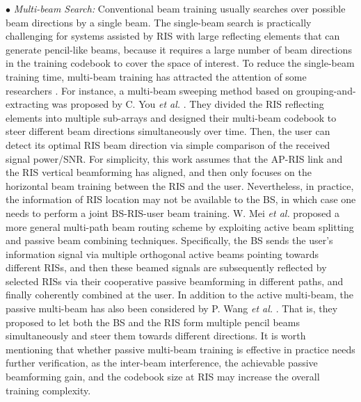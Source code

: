 \documentclass[journal,comsoc]{IEEEtran}
\begin{document}
$\bullet$ \emph{Multi-beam Search:} Conventional beam training usually searches over possible beam directions by a single beam. The single-beam search is practically challenging for systems assisted by RIS with large reflecting elements that can generate pencil-like beams, because it requires a large number of beam directions in the training codebook to cover the space of interest. To reduce the single-beam training time, multi-beam training has attracted the attention of some researchers \cite{Fast-Beam-Training-IRS-2020,Multi-Path-Beam-Routing-RIS-2022,Beam-Training-Alignment-RIS-2022,Fast-Beam-Training-Alignment-IRS-2022}. For instance, a multi-beam sweeping method based on grouping-and-extracting was proposed by C. You \emph{et al.} \cite{Fast-Beam-Training-IRS-2020}. They divided the RIS reflecting elements into multiple sub-arrays and designed their multi-beam codebook to steer different beam directions simultaneously over time. Then, the user can detect its optimal RIS beam direction via simple comparison of the received signal power/SNR. For simplicity, this work assumes that the AP-RIS link and the RIS vertical beamforming has aligned, and then only focuses on the horizontal beam training between the RIS and the user. Nevertheless, in practice, the information of RIS location may not be available to the BS, in which case one needs to perform a joint BS-RIS-user beam training. W. Mei \emph{et al.} \cite{Multi-Path-Beam-Routing-RIS-2022} proposed a more general multi-path beam routing scheme by exploiting  active beam splitting and passive beam combining techniques. Specifically, the BS sends the user's information signal via multiple orthogonal active beams pointing towards different RISs, and then these beamed signals are subsequently reflected by selected RISs via their cooperative passive beamforming in different paths, and finally coherently combined at the user. In addition to the active multi-beam, the passive multi-beam has also been considered by P. Wang \emph{et al.} \cite{Beam-Training-Alignment-RIS-2022,Fast-Beam-Training-Alignment-IRS-2022}. That is, they proposed to let both the BS and the RIS form multiple pencil beams simultaneously and steer them towards different directions. It is worth mentioning that whether passive multi-beam training is effective in practice needs further verification, as the inter-beam interference, the achievable passive beamforming gain, and the codebook size at RIS may increase the overall training complexity.
\end{document}
